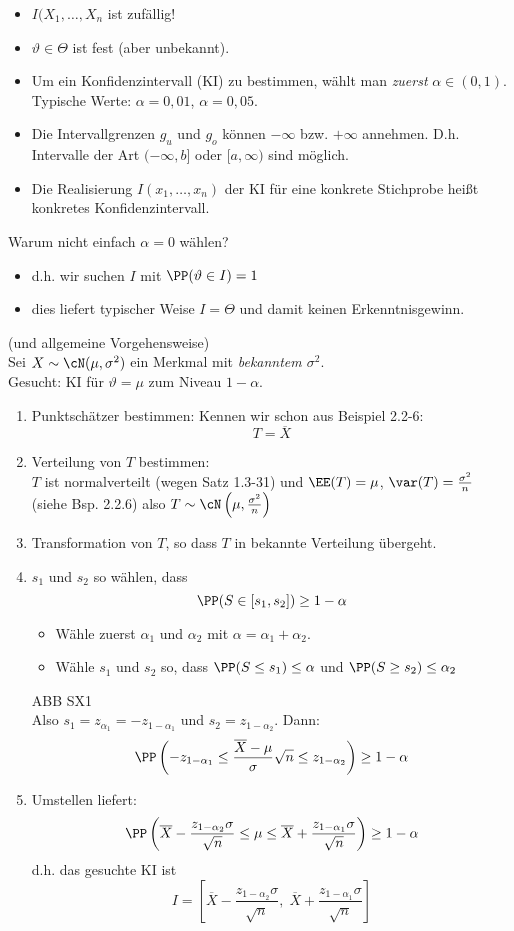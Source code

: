 \begin{itemize}
\item $I(X_1, \ldots, X_n$ ist zufällig!
\item $\vartheta \in \Theta$ ist fest (aber unbekannt).
\item Um ein Konfidenzintervall (KI) zu bestimmen, wählt man \emph{zuerst} $\alpha\in (0,1)$. Typische Werte: $\alpha = 0,01$, $\alpha = 0,05$.
\item Die Intervallgrenzen $g_u$ und $g_o$ können $-\infty$ bzw. $+\infty$ annehmen. D.h. Intervalle der Art $(-\infty, b]$ oder $[a,\infty)$ sind möglich.
\item Die Realisierung $I(x_1, \ldots, x_n)$ der KI für eine konkrete Stichprobe heißt konkretes Konfidenzintervall.
\end{itemize}
Warum nicht einfach $\alpha = 0$ wählen?
\begin{itemize}
\item d.h. wir suchen $I$ mit $\PP(\vartheta \in I) =1$
\item dies liefert typischer Weise $I=\Theta$ und damit keinen Erkenntnisgewinn.
\end{itemize}

 (und allgemeine Vorgehensweise)\\
Sei $X\sim \cN(\mu, \sigma^2)$ ein Merkmal mit \emph{bekanntem $\sigma^2$}.\\
Gesucht: KI für $\vartheta= \mu$ zum Niveau $1-\alpha$.
\begin{enumerate}
\item Punktschätzer bestimmen: Kennen wir schon aus Beispiel 2.2-6:
$$T=\overline{X}$$
\item Verteilung von $T$ bestimmen: \\
$T$ ist normalverteilt (wegen Satz 1.3-31) und $\EE(T) = \mu$, $\var (T) = \frac{\sigma^2}{n}$ (siehe Bsp. 2.2.6) also $T\sim \cN \left( \mu, \frac{\sigma^2}{n}\right)$
\item Transformation von $T$, so dass $T$ in bekannte Verteilung übergeht.
\item $s_1$ und $s_2$ so wählen, dass 
$$\PP(S \in [s_1, s_2]) \geq 1-\alpha$$
\begin{itemize}
\item Wähle zuerst $\alpha_1$ und $\alpha_2$ mit $\alpha = \alpha_1 + \alpha_2$.
\item Wähle $s_1$ und $s_2$ so, dass $\PP(S\leq s_1) \leq \alpha$ und $\PP(S\geq s_2) \leq \alpha_2$
\end{itemize}
ABB SX1\\
Also $s_1=z_{\alpha_1} = -z_{1-\alpha_1}$ und $s_2 = z_{1-\alpha_2}$. Dann:
$$\PP\left( - z_{1-\alpha_1} \leq \frac{\overline{X}-\mu}{\sigma}\sqrt{n} \leq z_{1-\alpha_2}\right) \geq 1-\alpha$$
\item Umstellen liefert:
$$\PP\left(\overline{X}-\frac{z_{1-\alpha_2}\sigma}{\sqrt{n}}\leq \mu \leq \overline{X} + \frac{z_{1-\alpha_1}\sigma}{\sqrt{n}}\right) \geq 1-\alpha$$
d.h. das gesuchte KI ist
$$I=\left[ \overline{X}-\frac{z_{1-\alpha_2}\sigma}{\sqrt{n}},\; \overline{X} + \frac{z_{1-\alpha_1}\sigma}{\sqrt{n}} \right]$$
\end{enumerate}

